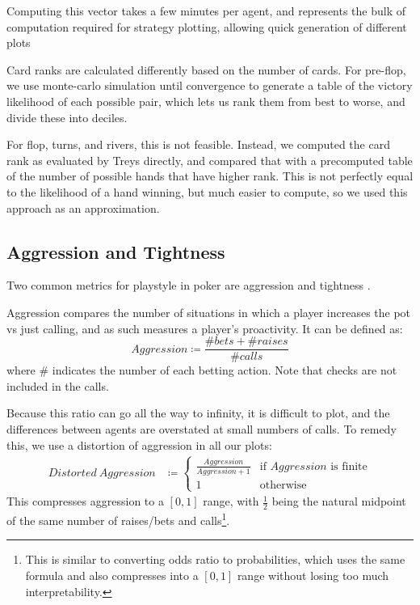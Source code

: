 Computing this vector takes a few minutes per agent, and represents the bulk of computation required for strategy plotting, allowing quick generation of different plots

Card ranks are calculated differently based on the number of cards. For pre-flop, we use monte-carlo simulation until convergence to generate a table of the victory likelihood of each possible pair, which lets us rank them from best to worse, and divide these into deciles.

For flop, turns, and rivers, this is not feasible. Instead, we computed the card rank as evaluated by Treys \cite{Treys} directly, and compared that with a precomputed table of the number of possible hands that have higher rank. This is not perfectly equal to the likelihood of a hand winning, but much easier to compute, so we used this approach as an approximation. 


\subsection{Aggression and Tightness}

Two common metrics for playstyle in poker are aggression and tightness \cite{PokerStrategy}.

Aggression compares the number of situations in which a player increases the pot vs just calling, and as such measures a player's proactivity. It can be defined as:
\begin{equation}
    Aggression \coloneqq \frac{\# bets + \# raises}{\# calls}
\end{equation} where \# indicates the number of each betting action. Note that checks are not included in the calls.

Because this ratio can go all the way to infinity, it is difficult to plot, and the differences between agents are overstated at small numbers of calls. To remedy this, we use a distortion of aggression in all our plots:
\begin{equation}
\begin{split}
Distorted\ Aggression &\coloneqq \begin{cases}
\frac{Aggression}{Aggression + 1} &\mbox{if }Aggression\mbox{ is finite} \\
1 &\mbox{otherwise}
\end{cases}
\end{split}
\end{equation}
This compresses aggression to a $[0, 1]$ range, with $\frac{1}{2}$ being the natural midpoint of the same number of raises/bets and calls\footnote{This is similar to converting odds ratio to probabilities, which uses the same formula and also compresses into a $[0, 1]$ range without losing too much interpretability.}.

